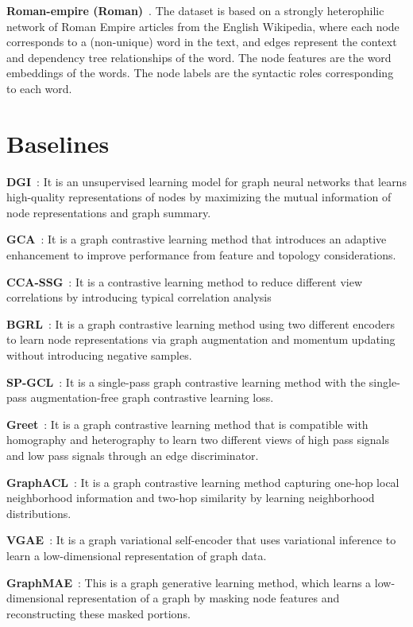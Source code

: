 \documentclass[sigconf]{acmart}
\begin{document}
\textbf{Roman-empire (Roman)}~\cite{roman}. The dataset is based on a strongly heterophilic network of Roman Empire articles from the English Wikipedia, where each node corresponds to a (non-unique) word in the text, and edges represent the context and dependency tree relationships of the word. The node features are the word embeddings of the words. The node labels are the syntactic roles corresponding to each word.


\section{Baselines}
\label{baselines}
\textbf{DGI}~\cite{dgi}: It is an unsupervised learning model for graph neural networks that learns high-quality representations of nodes by maximizing the mutual information of node representations and graph summary.

\textbf{GCA}~\cite{GCA}: It is a graph contrastive learning method that introduces an adaptive enhancement to improve performance from feature and topology considerations.

\textbf{CCA-SSG}~\cite{ccassg}: It is a contrastive learning method to reduce different view correlations by introducing typical correlation analysis

\textbf{BGRL}~\cite{BGRL}: It is a graph contrastive learning method using two different encoders to learn node representations via graph augmentation and momentum updating without introducing negative samples.

\textbf{SP-GCL}~\cite{sp-gcl}: It is a single-pass graph contrastive learning method with the single-pass augmentation-free graph contrastive learning loss.

\textbf{Greet}~\cite{greet}: It is a graph contrastive learning method that is compatible with homography and heterography to learn two different views of high pass signals and low pass signals through an edge discriminator.

\textbf{GraphACL}~\cite{graphacl}: It is a graph contrastive learning method capturing one-hop local neighborhood information and two-hop similarity by learning neighborhood distributions.

\textbf{VGAE}~\cite{vgae}: It is a graph variational self-encoder that uses variational inference to learn a low-dimensional representation of graph data.

\textbf{GraphMAE}~\cite{graphmae}: This is a graph generative learning method, which learns a low-dimensional representation of a graph by masking node features and reconstructing these masked portions.
\end{document}
